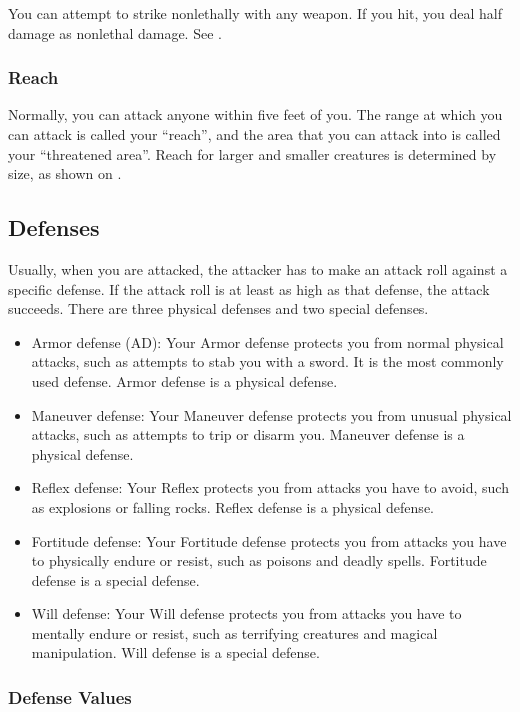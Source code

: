  You can attempt to strike nonlethally with any weapon. If you hit, you deal half damage as nonlethal damage. See .

\subsubsection{Reach}\label{Reach}
Normally, you can attack anyone within five feet of you. The range at which you can attack is called your ``reach'', and the area that you can attack into is called your ``threatened area''. Reach for larger and smaller creatures is determined by size, as shown on .

\subsection{Defenses}\label{Defenses}
Usually, when you are attacked, the attacker has to make an attack roll against a specific defense. If the attack roll is at least as high as that defense, the attack succeeds. There are three physical defenses and two special defenses.
\begin{itemize}
    \item Armor defense (AD): Your Armor defense protects you from normal physical attacks, such as attempts to stab you with a sword. It is the most commonly used defense. Armor defense is a physical defense.
    \item Maneuver defense: Your Maneuver defense protects you from unusual physical attacks, such as attempts to trip or disarm you. Maneuver defense is a physical defense.
    \item Reflex defense: Your Reflex protects you from attacks you have to avoid, such as explosions or falling rocks. Reflex defense is a physical defense.
    \item Fortitude defense: Your Fortitude defense protects you from attacks you have to physically endure or resist, such as poisons and deadly spells. Fortitude defense is a special defense. 
    \item Will defense: Your Will defense protects you from attacks you have to mentally endure or resist, such as terrifying creatures and magical manipulation. Will defense is a special defense.
\end{itemize}

\subsubsection{Defense Values}

